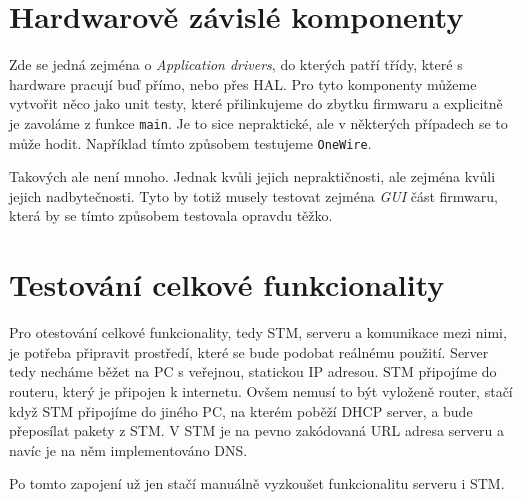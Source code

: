 \section{Hardwarově závislé komponenty}
Zde se jedná zejména o \emph{Application drivers}, do kterých patří třídy, které s hardware pracují
buď přímo, nebo přes HAL.
Pro tyto komponenty můžeme vytvořit něco jako unit testy, které přilinkujeme do zbytku firmwaru a explicitně
je zavoláme z funkce \texttt{main}.
Je to sice nepraktické, ale v některých případech se to může hodit.
Například tímto způsobem testujeme \texttt{OneWire}.

Takových  ale není mnoho.
Jednak kvůli jejich nepraktičnosti, ale zejména kvůli jejich nadbytečnosti.
Tyto  by totiž musely testovat zejména \emph{GUI} část firmwaru, která by se tímto způsobem
testovala opravdu těžko.

\section{Testování celkové funkcionality}
Pro otestování celkové funkcionality, tedy STM, serveru a komunikace mezi nimi, je potřeba připravit
prostředí, které se bude podobat reálnému použití.
Server tedy necháme běžet na PC s veřejnou, statickou IP adresou.
STM připojíme do routeru, který je připojen k internetu.
Ovšem nemusí to být vyloženě router, stačí když STM připojíme do jiného PC, na kterém poběží
DHCP server, a bude přeposílat pakety z STM.
V STM je na pevno zakódovaná URL adresa serveru a navíc je na něm implementováno DNS.

Po tomto zapojení už jen stačí manuálně vyzkoušet funkcionalitu serveru i STM.

